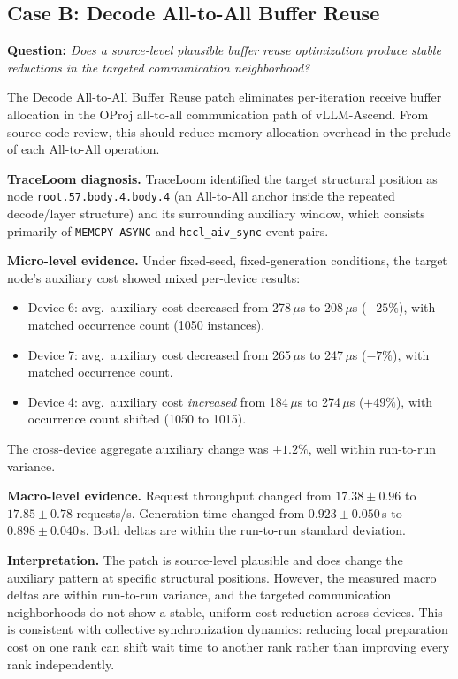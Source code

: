 \documentclass[conference]{IEEEtran}
\begin{document}
\subsection{Case B: Decode All-to-All Buffer Reuse}

\textbf{Question:} \emph{Does a source-level plausible buffer reuse
optimization produce stable reductions in the targeted communication
neighborhood?}

The Decode All-to-All Buffer Reuse patch eliminates per-iteration receive
buffer allocation in the OProj all-to-all communication path of vLLM-Ascend.
From source code review, this should reduce memory allocation overhead in the
prelude of each All-to-All operation.

\textbf{TraceLoom diagnosis.} TraceLoom identified the target structural
position as node \texttt{root.57.body.4.body.4} (an All-to-All anchor inside
the repeated decode/layer structure) and its surrounding auxiliary window,
which consists primarily of \texttt{MEMCPY ASYNC} and
\texttt{hccl\_aiv\_sync} event pairs.

\textbf{Micro-level evidence.} Under fixed-seed, fixed-generation conditions,
the target node's auxiliary cost showed mixed per-device results:

\begin{itemize}
\item Device 6: avg.\ auxiliary cost decreased from 278\,$\mu$s to 208\,$\mu$s
($-25\%$), with matched occurrence count (1050 instances).
\item Device 7: avg.\ auxiliary cost decreased from 265\,$\mu$s to 247\,$\mu$s
($-7\%$), with matched occurrence count.
\item Device 4: avg.\ auxiliary cost \emph{increased} from 184\,$\mu$s to
274\,$\mu$s ($+49\%$), with occurrence count shifted (1050 to 1015).
\end{itemize}

The cross-device aggregate auxiliary change was $+1.2\%$, well within
run-to-run variance.

\textbf{Macro-level evidence.} Request throughput changed from
$17.38 \pm 0.96$ to $17.85 \pm 0.78$ requests/s. Generation time changed from
$0.923 \pm 0.050$\,s to $0.898 \pm 0.040$\,s. Both deltas are within the
run-to-run standard deviation.

\textbf{Interpretation.} The patch is source-level plausible and does change
the auxiliary pattern at specific structural positions. However, the measured
macro deltas are within run-to-run variance, and the targeted communication
neighborhoods do not show a stable, uniform cost reduction across devices.
This is consistent with collective synchronization dynamics: reducing local
preparation cost on one rank can shift wait time to another rank rather than
improving every rank independently.
\end{document}
